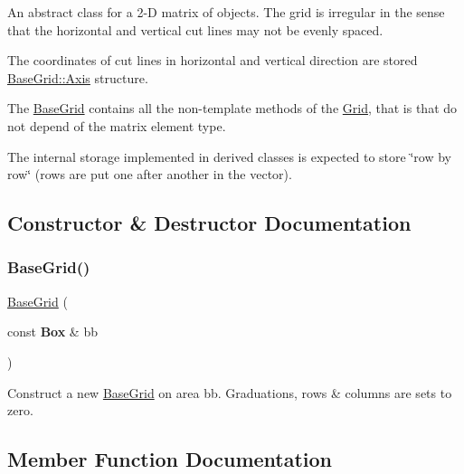 An abstract class for a 2-\/D matrix of objects. The grid is irregular in the sense that the horizontal and vertical cut lines may not be evenly spaced.

The coordinates of cut lines in horizontal and vertical direction are stored \hyperlink{classKatabatic_1_1BaseGrid_1_1Axis}{Base\+Grid\+::\+Axis} structure.

The \hyperlink{classKatabatic_1_1BaseGrid}{Base\+Grid} contains all the non-\/template methods of the \hyperlink{classKatabatic_1_1Grid}{Grid}, that is that do not depend of the matrix element type.

The internal storage implemented in derived classes is expected to store \char`\"{}row by row\char`\"{} (rows are put one after another in the vector). 

\subsection{Constructor \& Destructor Documentation}
\mbox{\label{classKatabatic_1_1BaseGrid_ac479157e8ac115074615167e8a4a2789}} 
\subsubsection{\texorpdfstring{Base\+Grid()}{BaseGrid()}}
{\footnotesize\ttfamily \hyperlink{classKatabatic_1_1BaseGrid}{Base\+Grid} (\begin{DoxyParamCaption}\item[{const \textbf{ Box} \&}]{bb }\end{DoxyParamCaption})\hspace{0.3cm}{\ttfamily [protected]}}

Construct a new \hyperlink{classKatabatic_1_1BaseGrid}{Base\+Grid} on area {\ttfamily bb}. Graduations, rows \& columns are sets to zero. 

\subsection{Member Function Documentation}
\mbox{\label{classKatabatic_1_1BaseGrid_a3a80b6032f86a56bec74609034b3246f}} 
